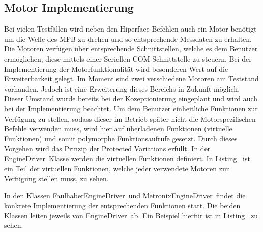 \subsection{Motor Implementierung}
	Bei vielen Testfällen wird neben den Hiperface Befehlen auch ein Motor benötigt um die Welle des \ac{MFB} zu 		drehen und so entsprechende Messdaten zu erhalten. Die Motoren verfügen über entsprechende 						Schnittstellen, welche es dem Benutzer ermöglichen, diese mittels einer Seriellen COM Schnittstelle zu 			steuern. Bei der Implementierung der Motorfunktionalität wird besonderen Wert auf die Erweiterbarkeit 			gelegt. Im Moment sind zwei verschiedene Motoren am Teststand vorhanden. Jedoch ist eine Erweiterung dieses Bereichs in Zukunft möglich. Dieser Umstand wurde bereits bei der Kozeptionierung eingeplant und wird 			auch bei der Implementierung beachtet. Um dem Benutzer einheitliche Funktionen zur Verfügung zu stellen, 	sodass dieser im Betrieb später nicht die Motorspezifischen Befehle verwenden muss, wird hier auf überladenen Funktionen (virtuelle Funktionen) und somit polymorphe Funktionsaufrufe				gesetzt. Durch dieses Vorgehen wird das Prinzip der Protected Variations erfüllt. In der \dq EngineDriver\dq~Klasse werden die virtuellen Funktionen definiert. In Listing \dq {}\dq~ist ein Teil der virtuellen Funktionen, welche jeder verwendete Motoren zur Verfügung stellen muss, zu sehen.
\newline
\begin{center}

\begin{minipage}[h]{\textwidth}
	
\end{minipage}

\end{center}
In den Klassen \dq FaulhaberEngineDriver\dq~und \dq MetronixEngineDriver\dq~findet die konkrete Implementierung der entsprechenden Funktionen statt. Die beiden Klassen leiten jeweils von \dq EngineDriver\dq~ab. Ein Beispiel hierfür ist in Listing \dq {}\dq~zu sehen.
\begin{center}

\begin{minipage}[h]{\textwidth}
	
\end{minipage}
\end{center}
